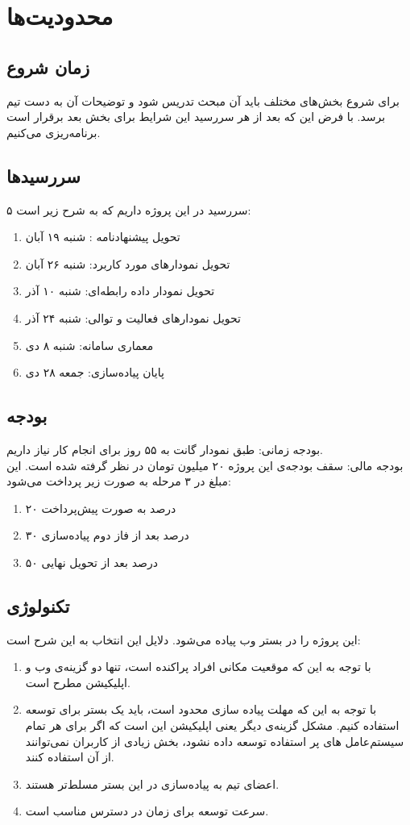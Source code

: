 \chapter{محدودیت‌ها}
\section{زمان شروع}
برای شروع بخش‌های مختلف باید آن مبحث تدریس شود و توضیحات آن به دست تیم برسد. با فرض این که بعد از هر سررسید این شرایط برای بخش بعد برقرار است برنامه‌ریزی می‌کنیم.
\section{سررسیدها}
۵ سررسید در این پروژه داریم که به شرح زیر است:
\begin{enumerate}
	\item 
	تحویل پیشنهادنامه : شنبه ۱۹ آبان
	\item 
	تحویل نمودارهای مورد کاربرد: شنبه ۲۶ آبان
	\item 
	تحویل نمودار داده رابطه‌ای: شنبه ۱۰ آذر
	\item
	تحویل نمودارهای فعالیت و توالی: شنبه ۲۴ آذر
	\item
	معماری سامانه: شنبه ۸ دی
	\item
	پایان پیاده‌سازی: جمعه  ۲۸ دی
\end{enumerate}

\section{بودجه}
بودجه زمانی: طبق نمودار گانت به ۵۵ روز برای انجام کار نیاز داریم.\\
بودجه مالی: سقف بودجه‌ی این پروژه ۲۰ میلیون تومان در نظر گرفته شده است. این مبلغ در ۳ مرحله به صورت زیر پرداخت می‌شود:
\begin{enumerate}
	\item 
	۲۰ درصد به صورت پیش‌پرداخت
	\item 
	۳۰ درصد بعد از فاز دوم پیاده‌سازی
	\item 
	۵۰ درصد بعد از تحویل نهایی
\end{enumerate}

\section{تکنولوژی}
این پروژه را در بستر وب پیاده می‌شود. دلایل این انتخاب به این شرح است:
\begin{enumerate}
	\item
	با توجه به این که موقعیت مکانی افراد پراکنده است، تنها دو گزینه‌‌ی وب و اپلیکیشن مطرح است.
	\item 
	با توجه به این که مهلت پیاده سازی محدود است، باید یک بستر برای توسعه استفاده کنیم. مشکل گزینه‌ی دیگر یعنی اپلیکیشن این است که اگر برای هر تمام سیستم‌عامل ‌های پر استفاده توسعه داده نشود، بخش زیادی از کاربران نمی‌توانند از آن استفاده کنند.
	\item
	اعضای تیم به پیاده‌سازی در این بستر مسلط‌تر هستند.
	\item 
	سرعت توسعه برای زمان در دسترس مناسب است.
\end{enumerate}
